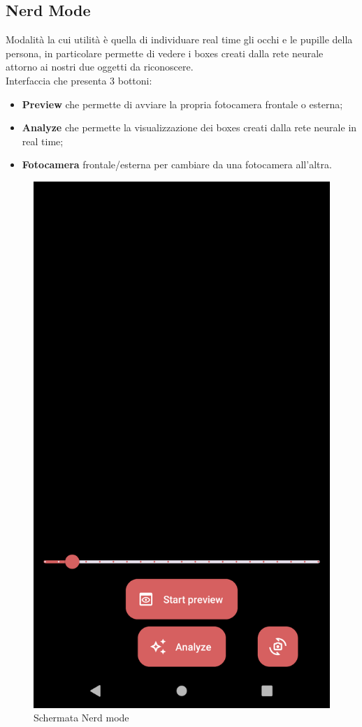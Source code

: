 \documentclass[11pt]{article}
\begin{document}
\subsection{Nerd Mode}
Modalità la cui utilità è quella di individuare real time gli occhi e le pupille della persona, in particolare permette di vedere i boxes creati dalla rete neurale attorno ai nostri due oggetti da riconoscere.
\\Interfaccia che presenta 3 bottoni:
\begin{itemize}
    \item \textbf{Preview} che permette di avviare la propria fotocamera frontale o esterna;
    \item \textbf{Analyze} che permette la visualizzazione dei boxes creati dalla rete neurale in real time;
    \item \textbf{Fotocamera} frontale/esterna per cambiare da una fotocamera all'altra.
\end{itemize}

\begin{figure}[h]
\caption{Schermata Nerd mode }
\centering
\includegraphics[scale=0.17]{img/nerd.png}
\end{figure}
\end{document}

